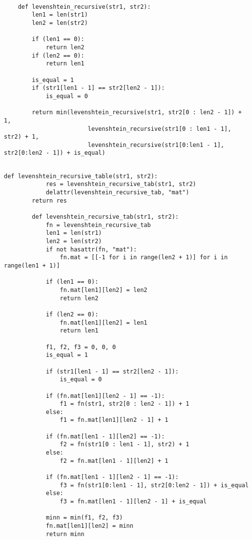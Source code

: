 \documentclass[12pt, a4paper]{report}
\begin{document}
	\begin{lstlisting}[label=some-code,caption=Рекурсивная реализация алгоритма Левенштейна]
	
	def levenshtein_recursive(str1, str2):
		len1 = len(str1)
		len2 = len(str2)
		
		if (len1 == 0):
			return len2
		if (len2 == 0):
			return len1
		
		is_equal = 1
		if (str1[len1 - 1] == str2[len2 - 1]):
			is_equal = 0
		
		return min(levenshtein_recursive(str1, str2[0 : len2 - 1]) + 1,
						levenshtein_recursive(str1[0 : len1 - 1], str2) + 1,
						levenshtein_recursive(str1[0:len1 - 1], str2[0:len2 - 1]) + is_equal)
	
	\end{lstlisting}

	\begin{lstlisting}[label=some-code,caption=Рекурсивная реализация с заполнением матрицу алгоритма Левенштейна]
		def levenshtein_recursive_table(str1, str2):
			res = levenshtein_recursive_tab(str1, str2)
			delattr(levenshtein_recursive_tab, "mat")
		return res
		
		def levenshtein_recursive_tab(str1, str2):
			fn = levenshtein_recursive_tab
			len1 = len(str1)
			len2 = len(str2)
			if not hasattr(fn, "mat"):
				fn.mat = [[-1 for i in range(len2 + 1)] for i in range(len1 + 1)]
		
			if (len1 == 0):
				fn.mat[len1][len2] = len2
				return len2
			
			if (len2 == 0):
				fn.mat[len1][len2] = len1
				return len1
		
			f1, f2, f3 = 0, 0, 0
			is_equal = 1
		
			if (str1[len1 - 1] == str2[len2 - 1]):
				is_equal = 0
		
			if (fn.mat[len1][len2 - 1] == -1):
				f1 = fn(str1, str2[0 : len2 - 1]) + 1
			else:
				f1 = fn.mat[len1][len2 - 1] + 1
		
			if (fn.mat[len1 - 1][len2] == -1):
				f2 = fn(str1[0 : len1 - 1], str2) + 1
			else:
				f2 = fn.mat[len1 - 1][len2] + 1
		
			if (fn.mat[len1 - 1][len2 - 1] == -1):
				f3 = fn(str1[0:len1 - 1], str2[0:len2 - 1]) + is_equal
			else:
				f3 = fn.mat[len1 - 1][len2 - 1] + is_equal
		
			minn = min(f1, f2, f3)
			fn.mat[len1][len2] = minn
			return minn
		
	\end{lstlisting}
\end{document}
